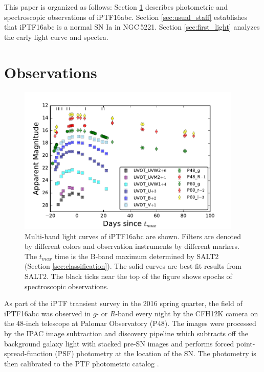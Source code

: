 \documentclass[twocolumn]{aastex61}
\begin{document}
This paper is organized as follows: Section \ref{sec:obs} describes
photometric and spectroscopic observations of iPTF16abc. Section
\ref{sec:usual_staff} establishes that iPTF16abc is a normal SN Ia
in NGC\,5221. Section \ref{sec:first_light} analyzes the early
light curve and spectra.

\section{Observations}
\label{sec:obs}

\begin{figure}[htb]
  \centering
  \includegraphics[width=0.95\textwidth]{lightcurve.pdf}
  \caption{Multi-band light curves of iPTF16abc are shown. Filters are
    denoted by different colors and observation instruments by
    different markers. The $t_{max}$ time is the B-band maximum
    determined by SALT2 (Section \ref{sec:classification}). The solid
    curves are best-fit results from SALT2. The black ticks near the
    top of the figure shows epochs of spectroscopic observations.}
  \label{fig:lightcurve}
\end{figure}

As part of the iPTF transient survey in the 2016 spring quarter, the
field of iPTF16abc was observed in $g$- or $R$-band every night by the
CFH12K camera \citep{2000SPIE.3965...58S} on the 48-inch telescope at
Palomar Observatory (P48). The images were processed by the IPAC image
subtraction and discovery pipeline which subtracts off the background
galaxy light with stacked pre-SN images and performs forced
point-spread-function (PSF) photometry at the location of the SN. The
photometry is then calibrated to the PTF photometric catalog
\citep{2012PASP..124..854O}.
\end{document}
